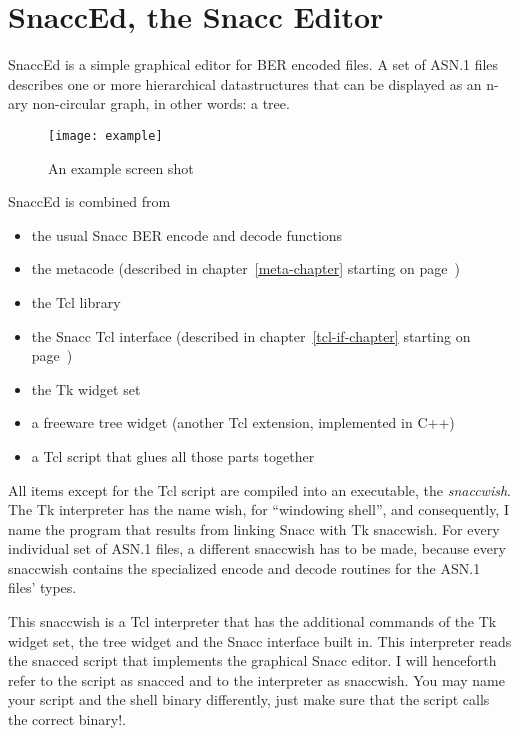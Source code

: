 
%

\chapter{\label{snacced-chapter}SnaccEd, the Snacc Editor}

SnaccEd is a simple graphical editor for BER encoded files.
A set of ASN.1 files describes one or more hierarchical datastructures that can be displayed as an n-ary non-circular graph, in other words: a tree.

\begin{figure}[ht!]
\begin{center}
\texttt{[image: example]}
\caption[SnaccEd: an example screen shot]{An example screen shot}
\label{snacced-example}
\end{center}
\end{figure}

SnaccEd is combined from
\begin{itemize}
  \item the usual Snacc BER encode and decode functions
  \item the metacode (described in chapter~\ref{meta-chapter} starting on page~\pageref{meta-chapter})
  \item the Tcl library
  \item the Snacc Tcl interface (described in chapter~\ref{tcl-if-chapter} starting on page~\pageref{tcl-if-chapter})
  \item the Tk widget set
  \item a freeware tree widget (another Tcl extension, implemented in C++)
  \item a Tcl script that glues all those parts together
\end{itemize}

All items except for the Tcl script are compiled into an executable, the \emph{snaccwish}.
The Tk interpreter has the name {\ufn wish}, for ``windowing shell'', and consequently, I name the program that results from linking Snacc with Tk {\ufn snaccwish}.
For every individual set of ASN.1 files, a different snaccwish has to be made, because every snaccwish contains the specialized encode and decode routines for the ASN.1 files' types.

This {\ufn snaccwish} is a Tcl interpreter that has the additional commands of the Tk widget set, the tree widget and the Snacc interface built in.
This interpreter reads the {\ufn snacced} script that implements the graphical Snacc editor.
I will henceforth refer to the script as {\ufn snacced} and to the interpreter as {\ufn snaccwish}.
You may name your script and the shell binary differently, just make sure that the script calls the correct binary!.


